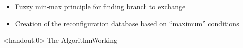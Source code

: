 \documentclass[xcolor=svgnames,aspectratio=32,8pt]{beamer}
\begin{document}
\begin{frame}
\begin{changemargin}{-0.9cm}{-1cm}
\begin{minipage}[H]{0.65\paperwidth}
\begin{itemize}
{\begin{tabular}{c|c}
      \hline
      \cellcolor{red!25}&\cellcolor{yellow!25}\\
      \cellcolor{red!25}{$\!\begin{aligned} 
        z_i &= max\left(\frac{I}{I_{max}}\right) & &\mathrm{for\ all\ branches}\\
        \mu A_i &= \frac{(z_{max}-z_i)}{(z_{max}-z_{min})} & &\mathrm{for}\ z_{min}<z_i<z_{max}\\
        \mu A_i &=1 & &\mathrm{for}\ z_i\le z_{min}\\
        \mu A_i &=0 & &\mathrm{for}\ z_i\ge z_{max}
        \end{aligned}$} &
      \cellcolor{yellow!25}{$\!\begin{aligned} 
            u_i &= max\left(\frac{IF_{max}-IF_{feeder}}{IF_{max}}\right) & &\mathrm{for\ all\ feeders}\\
            \mu B_i &= \frac{(u_{max}-u_i)}{(u_{max}-u_{min})} & &\mathrm{for}\ u_{min}<u_i<u_{max}\\
            \mu B_i &=1 & &\mathrm{for}\ u_i\le u_{min}\\
            \mu B_i &=0 & &\mathrm{for}\ u_i\ge u_{max}
            \end{aligned}$}\\
      \cellcolor{red!25} & \cellcolor{yellow!25}
    \end{tabular}
  }
  \vspace{0.3cm}
  \item Fuzzy min-max principle for finding branch to exchange
  \item Creation of the reconfiguration database based on ``maximum'' conditions
  \end{itemize}
  \end{minipage}

  \end{changemargin}
\end{frame}


\begin{frame}<handout:0>
  {The Algorithm}{Working}
    \vspace{0.6cm}
    \begin{changemargin}{-1cm}{-1cm}
    \begin{figure}[!h]
    \centering
    \resizebox{!}{0.45\paperwidth}{%
    
    }
    \end{figure}
    \end{changemargin}
\end{frame}
\end{document}
